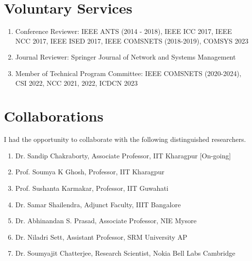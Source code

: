 \documentclass{article}
\begin{document}
\section{Voluntary Services}
  \begin{enumerate}
   \item Conference Reviewer: IEEE ANTS (2014 - 2018), IEEE ICC 2017, IEEE NCC 2017, IEEE ISED 2017, IEEE COMSNETS (2018-2019), COMSYS 2023
   \item Journal Reviewer: Springer Journal of Network and Systems Management
   \item Member of Technical Program Committee: IEEE  COMSNETS (2020-2024), CSI 2022, NCC 2021, 2022, ICDCN 2023
  \end{enumerate}
\section{Collaborations}
I had the opportunity to collaborate with the following distinguished researchers.
  \begin{enumerate}
  	\item Dr. Sandip Chakraborty, Associate Professor, IIT Kharagpur [On-going]
	\item Prof. Soumya K Ghosh, Professor, IIT Kharagpur
	\item Prof. Sushanta Karmakar, Professor, IIT Guwahati
	\item Dr. Samar Shailendra, Adjunct Faculty, IIIT Bangalore
	\item Dr. Abhinandan S. Prasad, Associate Professor, NIE Mysore
	\item Dr. Niladri Sett, Assistant Professor, SRM University AP
	\item Dr. Soumyajit Chatterjee, Research Scientist, Nokia Bell Labs Cambridge
  \end{enumerate}
\end{document}
